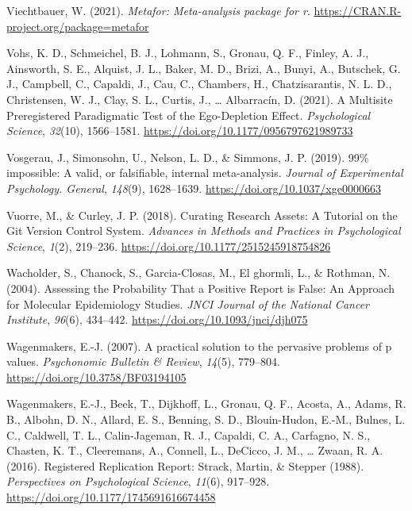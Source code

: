 \documentclass[
  oneside]{krantz}
\newlength{\cslhangindent}
\newlength{\cslentryspacingunit} %
\newenvironment{CSLReferences}[2] %
 {%
  \setlength{\parindent}{0pt}
  \ifodd #1
  \let\oldpar\par
  \def\par{\hangindent=\cslhangindent\oldpar}
  \fi
  \setlength{\parskip}{#2\cslentryspacingunit}
 }%
 {}
\begin{document}
\begin{CSLReferences}{1}{0}
\leavevmode{}%
Viechtbauer, W. (2021). \emph{Metafor: Meta-analysis package for r}.
\url{https://CRAN.R-project.org/package=metafor}

\leavevmode{}%
Vohs, K. D., Schmeichel, B. J., Lohmann, S., Gronau, Q. F., Finley, A.
J., Ainsworth, S. E., Alquist, J. L., Baker, M. D., Brizi, A., Bunyi,
A., Butschek, G. J., Campbell, C., Capaldi, J., Cau, C., Chambers, H.,
Chatzisarantis, N. L. D., Christensen, W. J., Clay, S. L., Curtis, J.,
\ldots{} Albarracín, D. (2021). A {Multisite Preregistered Paradigmatic
Test} of the {Ego-Depletion Effect}. \emph{Psychological Science},
\emph{32}(10), 1566--1581.
\url{https://doi.org/10.1177/0956797621989733}

\leavevmode{}%
Vosgerau, J., Simonsohn, U., Nelson, L. D., \& Simmons, J. P. (2019).
99\% impossible: {A} valid, or falsifiable, internal meta-analysis.
\emph{Journal of Experimental Psychology. General}, \emph{148}(9),
1628--1639. \url{https://doi.org/10.1037/xge0000663}

\leavevmode{}%
Vuorre, M., \& Curley, J. P. (2018). Curating {Research Assets}: {A
Tutorial} on the {Git Version Control System}. \emph{Advances in Methods
and Practices in Psychological Science}, \emph{1}(2), 219--236.
\url{https://doi.org/10.1177/2515245918754826}

\leavevmode{}%
Wacholder, S., Chanock, S., Garcia-Closas, M., El ghormli, L., \&
Rothman, N. (2004). Assessing the {Probability That} a {Positive Report}
is {False}: {An Approach} for {Molecular Epidemiology Studies}.
\emph{JNCI Journal of the National Cancer Institute}, \emph{96}(6),
434--442. \url{https://doi.org/10.1093/jnci/djh075}

\leavevmode{}%
Wagenmakers, E.-J. (2007). A practical solution to the pervasive
problems of p values. \emph{Psychonomic Bulletin \& Review},
\emph{14}(5), 779--804. \url{https://doi.org/10.3758/BF03194105}

\leavevmode{}%
Wagenmakers, E.-J., Beek, T., Dijkhoff, L., Gronau, Q. F., Acosta, A.,
Adams, R. B., Albohn, D. N., Allard, E. S., Benning, S. D.,
Blouin-Hudon, E.-M., Bulnes, L. C., Caldwell, T. L., Calin-Jageman, R.
J., Capaldi, C. A., Carfagno, N. S., Chasten, K. T., Cleeremans, A.,
Connell, L., DeCicco, J. M., \ldots{} Zwaan, R. A. (2016). Registered
{Replication Report}: {Strack}, {Martin}, \& {Stepper} (1988).
\emph{Perspectives on Psychological Science}, \emph{11}(6), 917--928.
\url{https://doi.org/10.1177/1745691616674458}


\end{CSLReferences}
\end{document}
